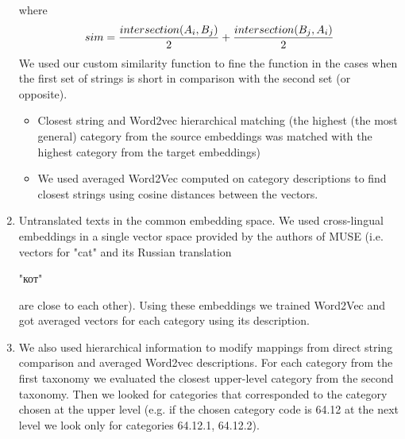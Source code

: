 \documentclass[conference]{IEEEtran}
\begin{document}
\begin{enumerate}
where $$sim = \dfrac{intersection(A_i,B_j)}{2} + \\ \dfrac{intersection(B_j, A_i)}{2} $$
We used our custom similarity function to fine the function in the cases when the first set of strings is short in comparison with the second set (or opposite).
\begin{itemize}
\item Closest string and Word2vec hierarchical matching (the highest (the most general) category from the source embeddings was matched with the highest category from the target embeddings)
\item We used averaged Word2Vec computed on category descriptions  to find closest strings using cosine distances between the vectors.
\end{itemize}
\item Untranslated texts in the common embedding space.
We used cross-lingual embeddings in a single vector space provided by the authors of MUSE (i.e. vectors for "cat" and its Russian translation \begin{russian}"кот"\end{russian} are close to each other). Using these embeddings we trained Word2Vec and got averaged vectors for each category using its description.
\item We also used hierarchical information to modify mappings from direct string comparison and averaged Word2vec descriptions. For each category from the first taxonomy we evaluated the closest upper-level category from the second taxonomy. Then we looked for categories that corresponded to the category chosen at the upper level (e.g. if the chosen category code is 64.12 at the next level we look only for categories 64.12.1, 64.12.2).
\end{enumerate}
\end{document}
